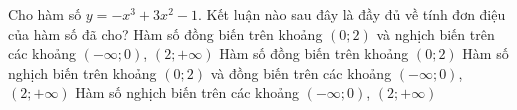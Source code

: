 \begin{ex}%
	Cho hàm số $y=-x^3+3x^2-1$. Kết luận nào sau đây là đầy đủ về tính đơn điệu của hàm số đã cho?
	\choice
	{\True Hàm số đồng biến trên khoảng $(0;2)$ và nghịch biến trên các khoảng $(-\infty;0)$, $\left(2;+\infty\right)$}
	{Hàm số đồng biến trên khoảng $(0;2)$}
	{Hàm số nghịch biến trên khoảng $(0;2)$ và đồng biến trên các khoảng  $(-\infty;0)$, $\left(2;+\infty\right)$}
	{Hàm số nghịch biến trên các khoảng  $(-\infty;0)$, $\left(2;+\infty\right)$}
\end{ex}
